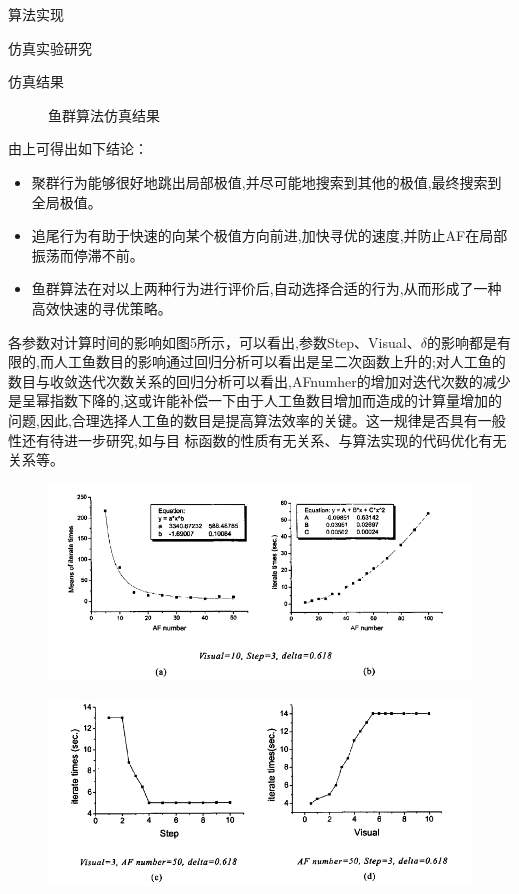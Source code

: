 \documentclass[UTF8]{ctexart}
\begin{document}
\begin{section}{算法实现}
\begin{subsection}{仿真实验研究}
\begin{subsubsection}{仿真结果}
\begin{figure}[H]
\caption{鱼群算法仿真结果}
\end{figure}
由上可得出如下结论：
\begin{itemize}
\item{聚群行为能够很好地跳出局部极值,并尽可能地搜索到其他的极值,最终搜索到全局极值。}
\item{追尾行为有助于快速的向某个极值方向前进,加快寻优的速度,并防止AF在局部振荡而停滞不前。}
\item{鱼群算法在对以上两种行为进行评价后,自动选择合适的行为,从而形成了一种高效快速的寻优策略。}
\end{itemize}

\end{subsubsection}
\begin{subsubsection}{各参数对计算时间的影响}如图5所示，可以看出,参数Step、Visual、$\delta$的影响都是有限的,而人工鱼数目的影响通过回归分析可以看出是呈二次函数上升的;对人工鱼的数目与收敛迭代次数关系的回归分析可以看出,AFnumher的增加对迭代次数的减少是呈幂指数下降的,这或许能补偿一下由于人工鱼数目增加而造成的计算量增加的问题,因此,合理选择人工鱼的数目是提高算法效率的关键。这一规律是否具有一般性还有待进一步研究,如与目
标函数的性质有无关系、与算法实现的代码优化有无关系等。
\begin{figure}[H]\centering
\includegraphics[width=1.0\textwidth]{../../pic/fish6.png}
\end{figure}
\begin{figure}[H]\centering
\includegraphics[width=1.0\textwidth]{../../pic/fish7.png}

\end{figure}
\end{subsubsection}
\end{subsection}
\end{section}
\end{document}
